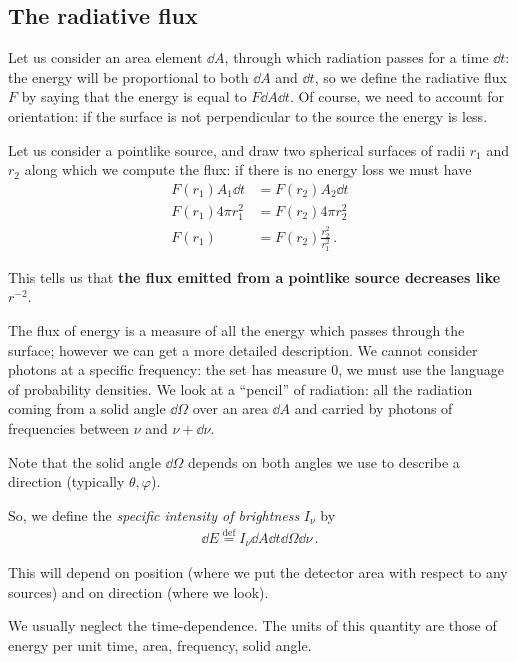 \documentclass[main.tex]{subfiles}
\begin{document}
\subsection{The radiative flux}

Let us consider an area element \(\dd{A}\), through which radiation passes for a time \(\dd{t}\): the energy will be proportional to both \(\dd{A}\) and \(\dd{t}\), so we define the radiative flux \(F\) by saying that the energy is equal to \(F \dd{A} \dd{t}\). 
Of course, we need to account for orientation: if the surface is not perpendicular to the source the energy is less. 

Let us consider a pointlike source, and draw two spherical surfaces of radii \(r_1 \) and \(r_2 \) along which we compute the flux: if there is no energy loss we must have 
%
\begin{subequations}
\begin{align}
F(r_1 ) A_1 \dd{t} &= F(r_2 ) A_2 \dd{t}  \\
 F(r_1 ) 4 \pi r_1^2 &= F(r_2 ) 4 \pi r_2^2 \\
 F(r_1 ) &= F(r_2 ) \frac{r_2^2}{r_1^2}
\,.
\end{align}
\end{subequations}

This tells us that \textbf{the flux emitted from a pointlike source decreases like \(r^{-2}\)}.

The flux of energy is a measure of all the energy which passes through the surface; however we can get a more detailed description. 
We cannot consider photons at a specific frequency: the set has measure 0, we must use the language of probability densities. 
We look at a ``pencil'' of radiation: all the radiation coming from a solid angle \(\dd{\Omega  }\) over an area \(\dd{A}\) and carried by photons of frequencies between \(\nu \) and \(\nu + \dd{\nu }\).

Note that the solid angle \(\dd{\Omega }\) depends on both angles we use to describe a direction (typically \(\theta , \varphi \)).

So, we define the \emph{specific intensity of brightness} \(I_{\nu }\) by
%
\begin{align}
\dd{E} \overset{\text{def}}{=} I_{\nu } \dd{A} \dd{t} \dd{\Omega } \dd{\nu }
\,.
\end{align}

This will depend on position (where we put the detector area with respect to any sources) and on direction (where we look). 

We usually neglect the time-dependence. The units of this quantity are those of energy per unit time, area, frequency, solid angle. 
\end{document}
